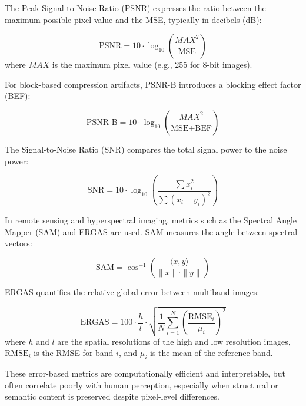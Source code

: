 The Peak Signal-to-Noise Ratio (PSNR) expresses the ratio between the maximum possible pixel value and the MSE, typically in decibels (dB):

\begin{equation}
\text{PSNR} = 10 \cdot \log_{10} \left( \frac{MAX^2}{\text{MSE}} \right)
\end{equation}
where $MAX$ is the maximum pixel value (e.g., 255 for 8-bit images).

For block-based compression artifacts, PSNR-B introduces a blocking effect factor (BEF):

\begin{equation}
\text{PSNR-B} = 10 \cdot \log_{10} \left( \frac{MAX^2}{\text{MSE} + \text{BEF}} \right)
\end{equation}

The Signal-to-Noise Ratio (SNR) compares the total signal power to the noise power:

\begin{equation}
\text{SNR} = 10 \cdot \log_{10} \left( \frac{\sum x_i^2}{\sum (x_i - y_i)^2} \right)
\end{equation}

In remote sensing and hyperspectral imaging, metrics such as the Spectral Angle Mapper (SAM) and ERGAS are used. SAM measures the angle between spectral vectors:

\begin{equation}
\text{SAM} = \cos^{-1} \left( \frac{\langle x, y \rangle}{\|x\| \cdot \|y\|} \right)
\end{equation}

ERGAS quantifies the relative global error between multiband images:

\begin{equation}
\text{ERGAS} = 100 \cdot \frac{h}{l} \cdot \sqrt{ \frac{1}{N} \sum_{i=1}^{N} \left( \frac{\text{RMSE}_i}{\mu_i} \right)^2 }
\end{equation}
where $h$ and $l$ are the spatial resolutions of the high and low resolution images, $\text{RMSE}_i$ is the RMSE for band $i$, and $\mu_i$ is the mean of the reference band.

These error-based metrics are computationally efficient and interpretable, but often correlate poorly with human perception, especially when structural or semantic content is preserved despite pixel-level differences.


